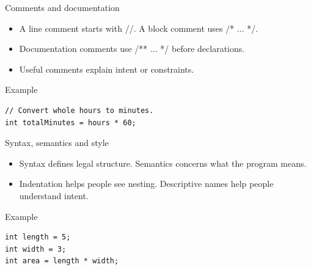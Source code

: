 \documentclass[10pt,aspectratio=169]{beamer}
\begin{document}
\begin{frame}[fragile,t]{Comments and documentation}
\begin{itemize}
\item A line comment starts with //. A block comment uses /* ... */.
\item Documentation comments use /** ... */ before declarations.
\item Useful comments explain intent or constraints.
\end{itemize}
\vspace{1mm}\begin{block}{Example}
\begin{lstlisting}
// Convert whole hours to minutes.
int totalMinutes = hours * 60;
\end{lstlisting}
\end{block}
\end{frame}

\begin{frame}[fragile,t]{Syntax, semantics and style}
\begin{itemize}
\item Syntax defines legal structure. Semantics concerns what the program means.
\item Indentation helps people see nesting. Descriptive names help people understand intent.
\end{itemize}
\vspace{1mm}\begin{block}{Example}
\begin{lstlisting}
int length = 5;
int width = 3;
int area = length * width;
\end{lstlisting}
\end{block}
\end{frame}
\end{document}

